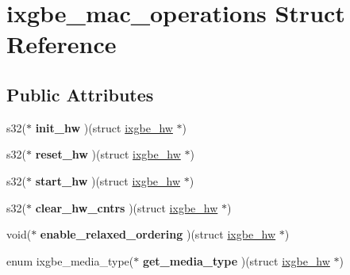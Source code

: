 \hypertarget{structixgbe__mac__operations}{
\section{ixgbe\_\-mac\_\-operations Struct Reference}
\label{structixgbe__mac__operations}
}
\subsection*{Public Attributes}
\begin{DoxyCompactItemize}
\item 
\hypertarget{structixgbe__mac__operations_aa55711346345b39098960da3c01d1ff8}{
s32($\ast$ {\bfseries init\_\-hw} )(struct \hyperlink{structixgbe__hw}{ixgbe\_\-hw} $\ast$)}
\label{structixgbe__mac__operations_aa55711346345b39098960da3c01d1ff8}

\item 
\hypertarget{structixgbe__mac__operations_a620e2a3a93044bc27554f519eda20c26}{
s32($\ast$ {\bfseries reset\_\-hw} )(struct \hyperlink{structixgbe__hw}{ixgbe\_\-hw} $\ast$)}
\label{structixgbe__mac__operations_a620e2a3a93044bc27554f519eda20c26}

\item 
\hypertarget{structixgbe__mac__operations_af76e0996cadd0316dbaddc4f4caa5f84}{
s32($\ast$ {\bfseries start\_\-hw} )(struct \hyperlink{structixgbe__hw}{ixgbe\_\-hw} $\ast$)}
\label{structixgbe__mac__operations_af76e0996cadd0316dbaddc4f4caa5f84}

\item 
\hypertarget{structixgbe__mac__operations_ae5d03c50e1fa701596ce028f37504201}{
s32($\ast$ {\bfseries clear\_\-hw\_\-cntrs} )(struct \hyperlink{structixgbe__hw}{ixgbe\_\-hw} $\ast$)}
\label{structixgbe__mac__operations_ae5d03c50e1fa701596ce028f37504201}

\item 
\hypertarget{structixgbe__mac__operations_a7b0b31c3d9fda3e62cf2d5780b8fa74b}{
void($\ast$ {\bfseries enable\_\-relaxed\_\-ordering} )(struct \hyperlink{structixgbe__hw}{ixgbe\_\-hw} $\ast$)}
\label{structixgbe__mac__operations_a7b0b31c3d9fda3e62cf2d5780b8fa74b}

\item 
\hypertarget{structixgbe__mac__operations_a24628f7700dcad81ebbc4b86ac2165dc}{
enum ixgbe\_\-media\_\-type($\ast$ {\bfseries get\_\-media\_\-type} )(struct \hyperlink{structixgbe__hw}{ixgbe\_\-hw} $\ast$)}
\label{structixgbe__mac__operations_a24628f7700dcad81ebbc4b86ac2165dc}


\end{DoxyCompactItemize}

